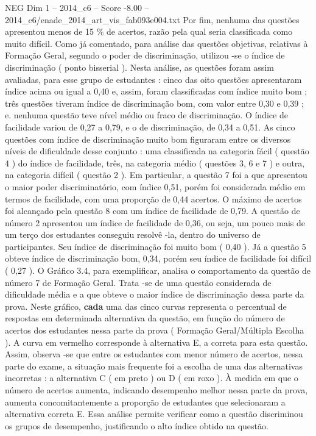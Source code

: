 \begin{textsample}{NEG Dim 1 – 2014\_c6 – Score -8.00 – 2014\_c6/enade\_2014\_art\_vis\_fab093e004.txt}
Por fim, nenhuma das questões apresentou menos de 15 \% de acertos, razão pela qual seria classificada como muito difícil.
Como já comentado, para análise das questões objetivas, relativas à Formação Geral, segundo o poder de discriminação, utilizou -se o índice de discriminação ( ponto bisserial ).
Nesta análise, as questões foram assim avaliadas, para esse grupo de estudantes : cinco das oito questões apresentaram índice acima ou igual a 0,40 e, assim, foram classificadas com índice muito bom ; três questões tiveram índice de discriminação bom, com valor entre 0,30 e 0,39 ; e. nenhuma questão teve nível médio ou fraco de discriminação.
O índice de facilidade variou de 0,27 a 0,79, e o de discriminação, de 0,34 a 0,51.
As cinco questões com índice de discriminação muito bom figuraram entre os diversos níveis de dificuldade desse conjunto : uma classificada na categoria fácil ( questão 4 ) do índice de facilidade, três, na categoria médio ( questões 3, 6 e 7 ) e outra, na categoria difícil ( questão 2 ).
Em particular, a questão 7 foi a que apresentou o maior poder discriminatório, com índice 0,51, porém foi considerada médio em termos de facilidade, com uma proporção de 0,44 acertos.
O máximo de acertos foi alcançado pela questão 8 com um índice de facilidade de 0,79.
A questão de número 2 apresentou um índice de facilidade de 0,36, ou seja, um pouco mais de um terço dos estudantes conseguiu resolvê -la, dentro do universo de participantes.
Seu índice de discriminação foi muito bom ( 0,40 ).
Já a questão 5 obteve índice de discriminação bom, 0,34, porém seu índice de facilidade foi difícil ( 0,27 ).
O Gráfico 3.4, para exemplificar, analisa o comportamento da questão de número 7 de Formação Geral.
Trata -se de uma questão considerada de dificuldade média e a que obteve o maior índice de discriminação dessa parte da prova.
Neste gráfico, \textbf{cada} uma das cinco curvas representa o percentual de respostas em determinada alternativa da questão, em função do número de acertos dos estudantes nessa parte da prova ( Formação Geral/Múltipla Escolha ).
A curva em vermelho corresponde à alternativa E, a correta para esta questão.
Assim, observa -se que entre os estudantes com menor número de acertos, nessa parte do exame, a situação mais frequente foi a escolha de uma das alternativas incorretas : a alternativa C ( em preto ) ou D ( em roxo ).
À medida em que o número de acertos aumenta, indicando desempenho melhor nessa parte da prova, aumenta concomitantemente a proporção de estudantes que selecionaram a alternativa correta E.
Essa análise permite verificar como a questão discriminou os grupos de desempenho, justificando o alto índice obtido na questão.

\end{textsample}
